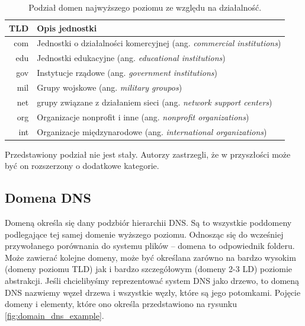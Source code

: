 \begin{table}[]
	\centering
	\caption{Podział domen najwyższego poziomu ze względu na działalność.}
	\label{podzial_tld}
	\begin{tabular}{|r|p{10.5cm}|}
		\hline
		\textbf{TLD} & \textbf{Opis jednostki} \\
		\hline\hline
		com & Jednostki o działalności komercyjnej (ang. \textit{commercial institutions}) \\
		\hline
		edu & Jednostki edukacyjne (ang. \textit{educational institutions})\\
		\hline
		gov & Instytucje rządowe (ang. \textit{government institutions}) \\
		\hline
		mil & Grupy wojskowe (ang. \textit{military groupos}) \\
		\hline
		net & grupy związane z działaniem sieci (ang. \textit{network support centers}) \\
		\hline
		org & Organizacje nonprofit i inne (ang. \textit{nonprofit organizations}) \\
		\hline
		int & Organizacje międzynarodowe (ang. \textit{international organizations}) \\
		\hline
	\end{tabular}
\end{table}

Przedstawiony podział nie jest stały. Autorzy zastrzegli, że w przyszłości może być on rozszerzony o dodatkowe kategorie.

\subsection{Domena DNS}
Domeną określa się dany podzbiór hierarchii DNS. Są to wszystkie poddomeny podlegające tej samej domenie wyższego poziomu. Odnosząc
się do wcześniej przywołanego porównania do systemu plików -- domena to odpowiednik folderu. Może zawierać kolejne domeny, może być
określana zarówno na bardzo wysokim (domeny poziomu TLD) jak i bardzo szczegółowym (domeny 2-3 LD) poziomie abstrakcji. Jeśli
chcielibyśmy reprezentować system DNS jako drzewo, to domeną DNS nazwiemy węzeł drzewa i wszystkie węzły, które są jego potomkami.
Pojęcie domeny i elementy, które ono określa przedstawiono na rysunku \ref{fig:domain_dns_example}.


